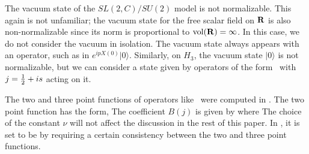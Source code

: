 The vacuum state of the $SL(2,C)/SU(2)$ model is
not normalizable. This again is not unfamiliar; the vacuum state
for the free scalar field on ${\bf R}$ is also non-normalizable since
its norm is proportional to ${\rm vol}({\bf R})=\infty$.
In this case, we do not
consider the vacuum in isolation. The vacuum state always appears
 with an operator,  such as in $e^{ipX(0)} |0\rangle$.
Similarly, on $H_3$, the vacuum state $|0\rangle$ is not normalizable,
but we can consider a state given by operators of the form \operators\
with $j = {1 \over 2} + is$ acting on it.


The two and three point functions of operators like \operators\ were
computed in \refs{\teschnerone,\zam,\teschnersecond}.
The two point function has the form,
\eqn{}
The
coefficient $B(j)$ is given by
\eqn{}
where
\eqn{}
The choice of the constant $\nu$ will not affect
the discussion in the rest of this paper.
In \teschnersecond , it is set to
be
\eqn{}
by requiring a certain consistency between the
two and three point functions.

